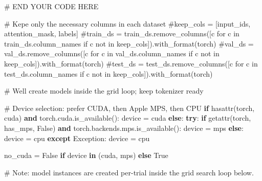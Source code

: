 \documentclass[
  letterpaper,
  DIV=11,
  numbers=noendperiod]{scrartcl}
\newenvironment{Shaded}{\begin{snugshade}}{\end{snugshade}}
\newcommand{\BuiltInTok}[1]{\textcolor[rgb]{0.00,0.23,0.31}{#1}}
\newcommand{\CommentTok}[1]{\textcolor[rgb]{0.37,0.37,0.37}{#1}}
\newcommand{\ControlFlowTok}[1]{\textcolor[rgb]{0.00,0.23,0.31}{\textbf{#1}}}
\newcommand{\KeywordTok}[1]{\textcolor[rgb]{0.00,0.23,0.31}{\textbf{#1}}}
\newcommand{\NormalTok}[1]{\textcolor[rgb]{0.00,0.23,0.31}{#1}}
\newcommand{\OperatorTok}[1]{\textcolor[rgb]{0.37,0.37,0.37}{#1}}
\newcommand{\PreprocessorTok}[1]{\textcolor[rgb]{0.68,0.00,0.00}{#1}}
\newcommand{\RegionMarkerTok}[1]{\textcolor[rgb]{0.00,0.23,0.31}{#1}}
\newcommand{\StringTok}[1]{\textcolor[rgb]{0.13,0.47,0.30}{#1}}
\newcommand{\VariableTok}[1]{\textcolor[rgb]{0.07,0.07,0.07}{#1}}
\begin{document}
\begin{Shaded}
\begin{Highlighting}[]
    \CommentTok{\# }\RegionMarkerTok{END}\CommentTok{ YOUR CODE HERE}

    \CommentTok{\# Kepe only the necessary columns in each dataset}
    \CommentTok{\#keep\_cols = [\textquotesingle{}input\_ids\textquotesingle{}, \textquotesingle{}attention\_mask\textquotesingle{}, \textquotesingle{}labels\textquotesingle{}]}
    \CommentTok{\#train\_ds = train\_ds.remove\_columns([c for c in train\_ds.column\_names if c not in keep\_cols]).with\_format(\textquotesingle{}torch\textquotesingle{})}
    \CommentTok{\#val\_ds = val\_ds.remove\_columns([c for c in val\_ds.column\_names if c not in keep\_cols]).with\_format(\textquotesingle{}torch\textquotesingle{})}
    \CommentTok{\#test\_ds = test\_ds.remove\_columns([c for c in test\_ds.column\_names if c not in keep\_cols]).with\_format(\textquotesingle{}torch\textquotesingle{})}

    \CommentTok{\# We\textquotesingle{}ll create models inside the grid loop; keep tokenizer ready}

    \CommentTok{\# Device selection: prefer CUDA, then Apple MPS, then CPU}
    \ControlFlowTok{if} \BuiltInTok{hasattr}\NormalTok{(torch, }\StringTok{\textquotesingle{}cuda\textquotesingle{}}\NormalTok{) }\KeywordTok{and}\NormalTok{ torch.cuda.is\_available():}
\NormalTok{        device }\OperatorTok{=} \StringTok{\textquotesingle{}cuda\textquotesingle{}}
    \ControlFlowTok{else}\NormalTok{:}
        \ControlFlowTok{try}\NormalTok{:}
            \ControlFlowTok{if} \BuiltInTok{getattr}\NormalTok{(torch, }\StringTok{\textquotesingle{}has\_mps\textquotesingle{}}\NormalTok{, }\VariableTok{False}\NormalTok{) }\KeywordTok{and}\NormalTok{ torch.backends.mps.is\_available():}
\NormalTok{                device }\OperatorTok{=} \StringTok{\textquotesingle{}mps\textquotesingle{}}
            \ControlFlowTok{else}\NormalTok{:}
\NormalTok{                device }\OperatorTok{=} \StringTok{\textquotesingle{}cpu\textquotesingle{}}
        \ControlFlowTok{except} \PreprocessorTok{Exception}\NormalTok{:}
\NormalTok{            device }\OperatorTok{=} \StringTok{\textquotesingle{}cpu\textquotesingle{}}

\NormalTok{    no\_cuda }\OperatorTok{=} \VariableTok{False} \ControlFlowTok{if}\NormalTok{ device }\KeywordTok{in}\NormalTok{ (}\StringTok{\textquotesingle{}cuda\textquotesingle{}}\NormalTok{, }\StringTok{\textquotesingle{}mps\textquotesingle{}}\NormalTok{) }\ControlFlowTok{else} \VariableTok{True}

    \CommentTok{\# Note: model instances are created per{-}trial inside the grid search loop below.}


\end{Highlighting}
\end{Shaded}
\end{document}
